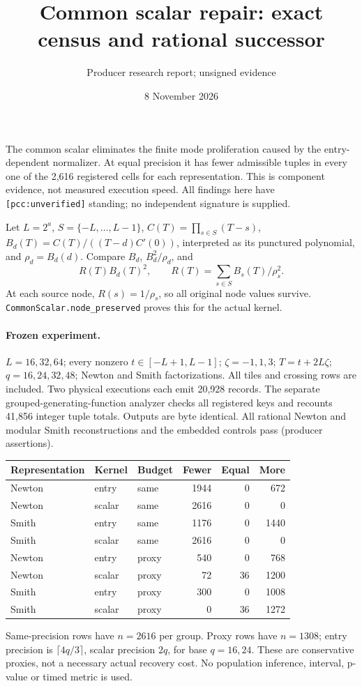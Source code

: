 \documentclass[10pt]{article}
\title{Common scalar repair: exact census and rational successor}
\author{Producer research report; unsigned evidence}
\date{8 November 2026}
\begin{document}
\maketitle
The common scalar eliminates the finite mode proliferation caused by the
entry-dependent normalizer. At equal precision it has fewer admissible tuples
in every one of the 2,616 registered cells for each representation. This is
component evidence, not measured execution speed. All findings here have
\texttt{[pcc:unverified]} standing; no independent signature is supplied.

Let $L=2^a$, $S=\{-L,\ldots,L-1\}$, $C(T)=\prod_{s\in S}(T-s)$,
$B_d(T)=C(T)/((T-d)C'(0))$, interpreted as its punctured polynomial, and
$\rho_d=B_d(d)$. Compare $B_d$, $B_d^2/\rho_d$, and
\[R(T)B_d(T)^2,\qquad R(T)=\sum_{s\in S} B_s(T)/\rho_s^2.\]
At each source node, $R(s)=1/\rho_s$, so all original node values survive.
\texttt{CommonScalar.node\_preserved} proves this for the actual kernel.

\paragraph{Frozen experiment.}
$L=16,32,64$; every nonzero $t\in[-L+1,L-1]$; $\zeta=-1,1,3$;
$T=t+2L\zeta$; $q=16,24,32,48$; Newton and Smith factorizations.
All tiles and crossing rows are included. Two physical executions each emit
20,928 records. The separate grouped-generating-function analyzer checks all
registered keys and recounts 41,856 integer tuple totals. Outputs are byte
identical. All rational Newton and modular Smith reconstructions and the
embedded controls pass (producer assertions).

\begin{center}\small
\begin{tabular}{lllrrr}\toprule
Representation & Kernel & Budget & Fewer & Equal & More\\\midrule
Newton & entry & same &1944&0&672\\
Newton & scalar & same &2616&0&0\\
Smith & entry & same &1176&0&1440\\
Smith & scalar & same &2616&0&0\\
Newton & entry & proxy &540&0&768\\
Newton & scalar & proxy &72&36&1200\\
Smith & entry & proxy &300&0&1008\\
Smith & scalar & proxy &0&36&1272\\\bottomrule
\end{tabular}\end{center}
Same-precision rows have $n=2616$ per group. Proxy rows have $n=1308$;
entry precision is $\lceil4q/3\rceil$, scalar precision $2q$, for base
$q=16,24$. These are conservative proxies, not a necessary actual recovery cost.
No population inference, interval, p-value or timed metric is used.
\end{document}
